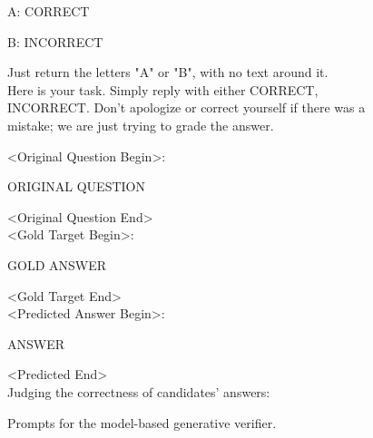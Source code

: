 \begin{figure*}[h]
\begin{AIbox}{}
{A: CORRECT 

B: INCORRECT

Just return the letters "A" or "B", with no text around it.
\\

Here is your task. Simply reply with either CORRECT, INCORRECT. Don't apologize or correct yourself if there was a mistake; we are just trying to grade the answer.


<Original Question Begin>: 

{ORIGINAL QUESTION}

<Original Question End>
\\

<Gold Target Begin>: 

{GOLD ANSWER}

<Gold Target End>
\\

<Predicted Answer Begin>: 

{ANSWER}

<Predicted End>
\\

Judging the correctness of candidates' answers:


}
\end{AIbox} 
\caption{Prompts for the model-based generative verifier.}
\label{fig: verifier prompt}
\end{figure*}

